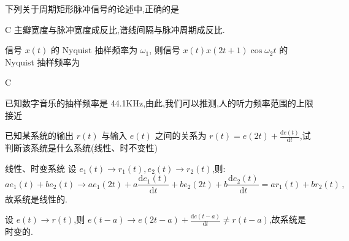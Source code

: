 \documentclass[list,answers,csize4,custom]{sysuexam}
\begin{document}
\begin{groups}
\begin{questions}[rs]
    \question[5] 下列关于周期矩形脉冲信号的论述中,正确的是\kh
    \begin{solution}
    \answer C
    \analysis 主瓣宽度与脉冲宽度成反比,谱线间隔与脉冲周期成反比.
    \end{solution}
\end{questions}

\begin{questions}[rs]
    \question[2]信号 $x(t)$ 的 Nyquist 抽样频率为 $\omega_{1}$, 则信号 $x(t) x(2 t+1) \cos \omega_{2} t$ 的 Nyquist 抽样频率为\kh
    \begin{solution}
        \answer C
    \end{solution}

    \question[2]已知数字音乐的抽样频率是 44.1KHz,由此,我们可以推测,人的听力频率范围的上限接近
\end{questions}

\begin{questions}[rs]
    \question[5] 已知某系统的输出 $r(t)$ 与输入 $e(t)$ 之间的关系为 $r(t)=e(2 t)+\frac{\mathrm{d} e(t)}{\mathrm{d} t}$,试判断该系统是什么系统(线性、时不变性)\hx
    \begin{solution}
        \answer 线性、时变系统
        \analysis 设 $e_{1}(t) \rightarrow r_{1}(t),e_{2}(t) \rightarrow r_{2}(t)$,则:
        $$
        a e_{1}(t)+b e_{2}(t) \rightarrow a e_{1}(2 t)+a \frac{\mathrm{d} e_{1}(t)}{\mathrm{d} t}+b e_{2}(2 t)+b \frac{\mathrm{d} e_{2}(t)}{\mathrm{d} t}=a r_{1}(t)+b r_{2}(t)\,,
        $$故系统是线性的.

        \sj 设 $e(t) \rightarrow r(t)$,则 $e(t-a) \rightarrow e(2 t-a)+\frac{\mathrm{d} e(t-a)}{\mathrm{d} t} \neq r(t-a)$,故系统是时变的.
    \end{solution}


\end{questions}
\end{groups}
\end{document}
